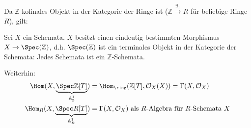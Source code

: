 Da $\mathbb{Z}$ kofinales Objekt in der Kategorie der Ringe ist ($\mathbb{Z}\overset{\exists_{1}}{\rightarrow}R$
für beliebige Ringe $R$), gilt:
\begin{cor}[6]
  Sei $X$ ein Schemata. $X$ besitzt einen eindeutig bestimmten Morphismus
  $X\rightarrow\Spec(\mathbb{Z})$, d.h. $\Spec(\mathbb{Z})$ ist ein
  terminales Objekt in der Kategorie der Schemata: Jedes Schemata ist
  ein $\mathbb{Z}$-Schemata.
\end{cor}

Weiterhin:
\begin{align*}
  \Hom(X,\underbrace{\Spec\mathbb{Z}[T]}_{\mathbb{A}_{\mathbb{Z}}^{1}}) & =\Hom_{\ring}(\mathbb{Z}[T],\mathcal{O}_{X}(X))=\Gamma(X,\mathcal{O}_{X})\\
  \Hom_{R}(X,\underbrace{\Spec R[T]}_{\mathbb{A}_{R}^{1}}) & =\Gamma(X,\mathcal{O}_{X})\text{ als }R\text{-Algebra für }R\text{-Schemata }X
\end{align*}

